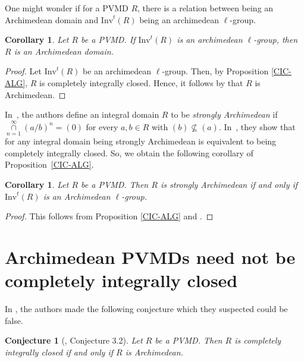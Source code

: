 \documentclass[12pt]{amsart}
\newtheorem{corollary}[theorem]{Corollary}
\newtheorem{conjecture}[theorem]{Conjecture}
\theoremstyle{definition}\newtheorem{remark}[theorem]{Remark}
\theoremstyle{definition}\newtheorem{definition}[theorem]{Definition}
\begin{document}
One might wonder if for a PVMD $R$, there is a relation between being an Archimedean domain and $\text{Inv}^t(R)$ being an archimedean $\ell$-group. 
\begin{corollary}\label{Cor:l-group}
Let $R$ be a PVMD. If $\text{Inv}^t(R)$ is an archimedean $\ell$-group, then $R$ is an Archimedean domain. 
\end{corollary}
\begin{proof}
    Let $\text{Inv}^t(R)$ be an archimedean $\ell$-group. Then, by Proposition \ref{CIC-ALG}, $R$ is completely integrally closed. Hence, it follows by \cite[Corollary 3.4]{Anderson2017} that $R$ is Archimedean. 
\end{proof}

In~\cite{Anderson2017}, the authors define an integral domain $R$ to be \emph{strongly Archimedean} if $\mathop{\cap}\limits_{n =1}^\infty (a/b)^n = (0)$ for every $a, b \in R$ with $(b) \not\subseteq (a)$. In~\cite[Proposition 3.3]{Anderson2017}, they show that for any integral domain being strongly Archimedean is equivalent to being completely integrally closed. So, we obtain the following corollary of Proposition~\ref{CIC-ALG}.

\begin{corollary}
Let $R$ be a PVMD. Then $R$ is strongly Archimedean if and only if $\text{Inv}^t(R)$ is an Archimedean $\ell$-group. 
\end{corollary}
\begin{proof}
This follows from Proposition \ref{CIC-ALG} and \cite[Proposition 3.3]{Anderson2017}.
\end{proof}
\section{Archimedean PVMDs need not be completely integrally closed}
In \cite{Anderson2017}, the authors made the following conjecture which they suspected could be false. 
\begin{conjecture}[\cite{Anderson2017}, Conjecture 3.2]
    Let $R$ be a PVMD. Then $R$ is completely integrally closed if and only if $R$ is Archimedean.
\end{conjecture}
\end{document}
